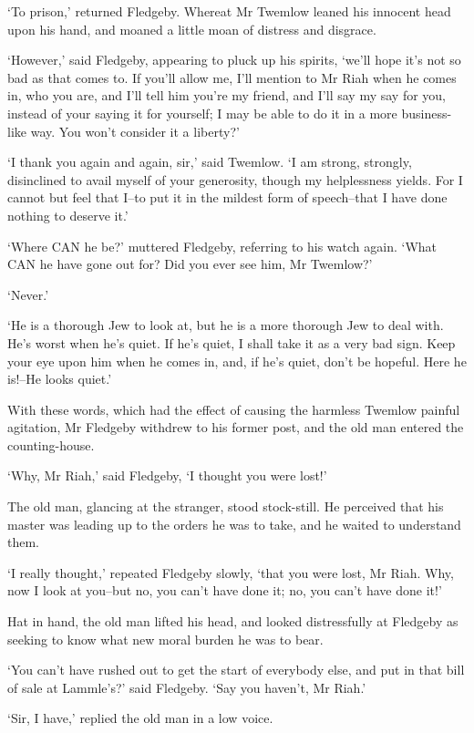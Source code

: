 ‘To prison,’ returned Fledgeby. Whereat Mr Twemlow leaned his innocent
head upon his hand, and moaned a little moan of distress and disgrace.

‘However,’ said Fledgeby, appearing to pluck up his spirits, ‘we’ll hope
it’s not so bad as that comes to. If you’ll allow me, I’ll mention to Mr
Riah when he comes in, who you are, and I’ll tell him you’re my friend,
and I’ll say my say for you, instead of your saying it for yourself; I
may be able to do it in a more business-like way. You won’t consider it
a liberty?’

‘I thank you again and again, sir,’ said Twemlow. ‘I am strong,
strongly, disinclined to avail myself of your generosity, though my
helplessness yields. For I cannot but feel that I--to put it in the
mildest form of speech--that I have done nothing to deserve it.’

‘Where CAN he be?’ muttered Fledgeby, referring to his watch again.
‘What CAN he have gone out for? Did you ever see him, Mr Twemlow?’

‘Never.’

‘He is a thorough Jew to look at, but he is a more thorough Jew to deal
with. He’s worst when he’s quiet. If he’s quiet, I shall take it as a
very bad sign. Keep your eye upon him when he comes in, and, if he’s
quiet, don’t be hopeful. Here he is!--He looks quiet.’

With these words, which had the effect of causing the harmless Twemlow
painful agitation, Mr Fledgeby withdrew to his former post, and the old
man entered the counting-house.

‘Why, Mr Riah,’ said Fledgeby, ‘I thought you were lost!’

The old man, glancing at the stranger, stood stock-still. He perceived
that his master was leading up to the orders he was to take, and he
waited to understand them.

‘I really thought,’ repeated Fledgeby slowly, ‘that you were lost, Mr
Riah. Why, now I look at you--but no, you can’t have done it; no, you
can’t have done it!’

Hat in hand, the old man lifted his head, and looked distressfully at
Fledgeby as seeking to know what new moral burden he was to bear.

‘You can’t have rushed out to get the start of everybody else, and put
in that bill of sale at Lammle’s?’ said Fledgeby. ‘Say you haven’t, Mr
Riah.’

‘Sir, I have,’ replied the old man in a low voice.

